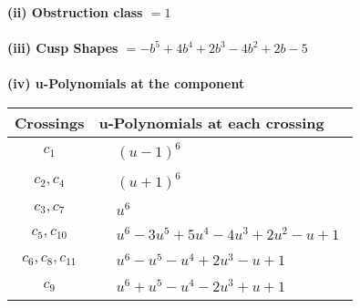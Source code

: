 \documentclass[1p]{elsarticle_modified}
\theoremstyle{definition}
\begin{document}
\flushleft \textbf{(ii) Obstruction class $= 1$}\\~\\
\flushleft \textbf{(iii) Cusp Shapes $= - b^5+4 b^4+2 b^3-4 b^2+2 b-5$}\\~\\
\newpage\renewcommand{\arraystretch}{1}
\flushleft \textbf{(iv) u-Polynomials at the component}\newline \\
\begin{tabular}{m{50pt}|m{274pt}}
Crossings & \hspace{64pt}u-Polynomials at each crossing \\
\hline $$\begin{aligned}c_{1}\end{aligned}$$&$\begin{aligned}
&(u-1)^6
\end{aligned}$\\
\hline $$\begin{aligned}c_{2},c_{4}\end{aligned}$$&$\begin{aligned}
&(u+1)^6
\end{aligned}$\\
\hline $$\begin{aligned}c_{3},c_{7}\end{aligned}$$&$\begin{aligned}
&u^6
\end{aligned}$\\
\hline $$\begin{aligned}c_{5},c_{10}\end{aligned}$$&$\begin{aligned}
&u^6-3 u^5+5 u^4-4 u^3+2 u^2- u+1
\end{aligned}$\\
\hline $$\begin{aligned}c_{6},c_{8},c_{11}\end{aligned}$$&$\begin{aligned}
&u^6- u^5- u^4+2 u^3- u+1
\end{aligned}$\\
\hline $$\begin{aligned}c_{9}\end{aligned}$$&$\begin{aligned}
&u^6+u^5- u^4-2 u^3+u+1
\end{aligned}$\\
\hline
\end{tabular}\\~\\
\end{document}
